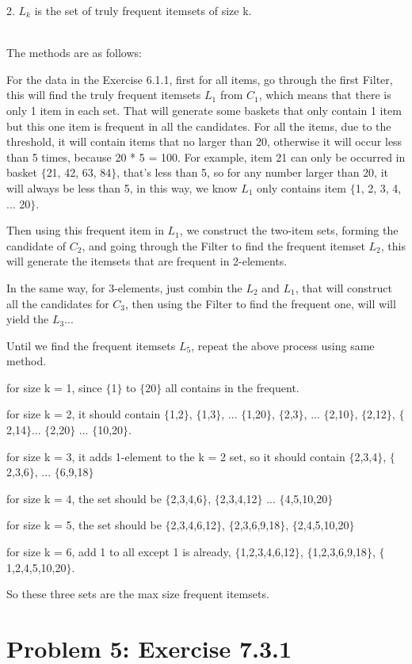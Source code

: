 \documentclass{article}
\begin{document}
2. $L_k$ is the set of truly frequent itemsets of size k.

~\\
The methods are as follows:

For the data in the Exercise 6.1.1, first for all items, go through the first Filter, this will find the truly frequent itemsets $L_1$ from $C_1$, which means that there is only 1 item in each set. That will generate some baskets that only contain 1 item but this one item is frequent in all the candidates. For all the items, due to the threshold, it will contain items that no larger than 20, otherwise it will occur less than 5 times, because 20 * 5 = 100. For example, item 21 can only be occurred in basket $\{$21, 42, 63, 84$\}$, that's less than 5, so for any number larger than 20, it will always be less than 5, in this way, we know $L_1$ only contains item $\{$1, 2, 3, 4, ... 20$\}$.

Then using this frequent item in $L_1$, we construct the two-item sets, forming the candidate of $C_2$, and going through the Filter to find the frequent itemset $L_2$, this will generate the itemsets that are frequent in 2-elements.

In the same way, for 3-elements, just combin the $L_2$ and $L_1$, that will construct all the candidates for $C_3$, then using the Filter to find the frequent one, will will yield the $L_3$...

Until we find the frequent itemsets $L_5$, repeat the above process using same method.

for size k = 1, since $\{$1$\}$ to $\{$20$\}$ all contains in the frequent.

for size k = 2, it should contain $\{$1,2$\}$, $\{$1,3$\}$, ... $\{$1,20$\}$, $\{$2,3$\}$, ... $\{$2,10$\}$, $\{$2,12$\}$, $\{$2,14$\}$... $\{$2,20$\}$ ... $\{$10,20$\}$.

for size k = 3, it adds 1-element to the k = 2 set, so it should contain $\{$2,3,4$\}$, $\{$2,3,6$\}$, ... $\{$6,9,18$\}$

for size k = 4, the set should be $\{$2,3,4,6$\}$, $\{$2,3,4,12$\}$ ... $\{$4,5,10,20$\}$

for size k = 5, the set should be $\{$2,3,4,6,12$\}$, $\{$2,3,6,9,18$\}$, $\{$2,4,5,10,20$\}$

for size k = 6, add 1 to all except 1 is already, $\{$1,2,3,4,6,12$\}$, $\{$1,2,3,6,9,18$\}$, $\{$1,2,4,5,10,20$\}$.

So these three sets are the max size frequent itemsets.


\section{Problem 5: Exercise 7.3.1}
\end{document}
